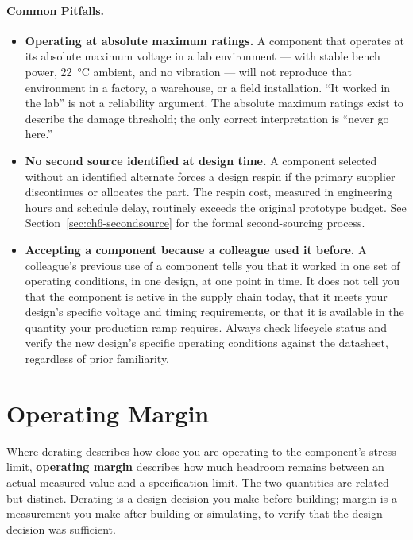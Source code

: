 \paragraph{Common Pitfalls.}
\begin{itemize}
  \item \textbf{Operating at absolute maximum ratings.}
        A component that operates at its absolute maximum voltage in a lab environment --- with stable bench power, 22~°C ambient, and no vibration --- will not reproduce that environment in a factory, a warehouse, or a field installation.
        ``It worked in the lab'' is not a reliability argument.
        The absolute maximum ratings exist to describe the damage threshold; the only correct interpretation is ``never go here.''
  \item \textbf{No second source identified at design time.}
        A component selected without an identified alternate forces a design respin if the primary supplier discontinues or allocates the part.
        The respin cost, measured in engineering hours and schedule delay, routinely exceeds the original prototype budget.
        See Section~\ref{sec:ch6-secondsource} for the formal second-sourcing process.
  \item \textbf{Accepting a component because a colleague used it before.}
        A colleague's previous use of a component tells you that it worked in one set of operating conditions, in one design, at one point in time.
        It does not tell you that the component is active in the supply chain today, that it meets your design's specific voltage and timing requirements, or that it is available in the quantity your production ramp requires.
        Always check lifecycle status and verify the new design's specific operating conditions against the datasheet, regardless of prior familiarity.
\end{itemize}

\section{Operating Margin}
\label{sec:ch6-margin}

Where derating describes how close you are operating to the component's stress limit, \textbf{operating margin} describes how much headroom remains between an actual measured value and a specification limit.
The two quantities are related but distinct.
Derating is a design decision you make before building; margin is a measurement you make after building or simulating, to verify that the design decision was sufficient.

